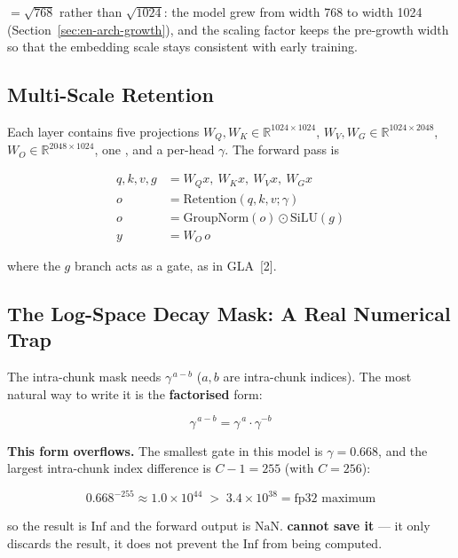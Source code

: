 \documentclass[11pt,openany]{article}
\begin{document}
\begin{notebox}
 $= \sqrt{768}$ rather than $\sqrt{1024}$: the model grew from width
768 to width 1024 (Section~\ref{sec:en-arch-growth}), and the scaling factor keeps the
pre-growth width so that the embedding scale stays consistent with early training.
\end{notebox}

\subsection{Multi-Scale Retention}
\label{sec:en-arch-msr}

Each  layer contains five projections
$W_Q, W_K \in \mathbb{R}^{1024 \times 1024}$,
$W_V, W_G \in \mathbb{R}^{1024 \times 2048}$,
$W_O \in \mathbb{R}^{2048 \times 1024}$, one , and a per-head $\gamma$.
The forward pass is

\[
\begin{aligned}
q, k, v, g &= W_Q x,\ W_K x,\ W_V x,\ W_G x \\
o &= \text{Retention}(q, k, v; \gamma) \\
o &= \text{GroupNorm}(o) \odot \text{SiLU}(g) \\
y &= W_O\, o
\end{aligned}
\]

where the $g$ branch acts as a gate, as in GLA~[2].

\subsection{The Log-Space Decay Mask: A Real Numerical Trap}
\label{sec:en-arch-mask}

The intra-chunk mask needs $\gamma^{\,a-b}$ ($a, b$ are intra-chunk indices). The most
natural way to write it is the \textbf{factorised} form:

\[
\gamma^{\,a-b} = \gamma^{\,a} \cdot \gamma^{-b}
\]

\textbf{This form overflows.} The smallest gate in this model is $\gamma = 0.668$, and
the largest intra-chunk index difference is $C-1 = 255$ (with $C = 256$):

\[
0.668^{-255} \approx 1.0 \times 10^{44} \;>\; 3.4 \times 10^{38} = \text{fp32 maximum}
\]

so the result is $\text{Inf}$ and the forward output is $\text{NaN}$.
\textbf{ cannot save it} --- it only discards the result, it does not
prevent the $\text{Inf}$ from being computed.
\end{document}
